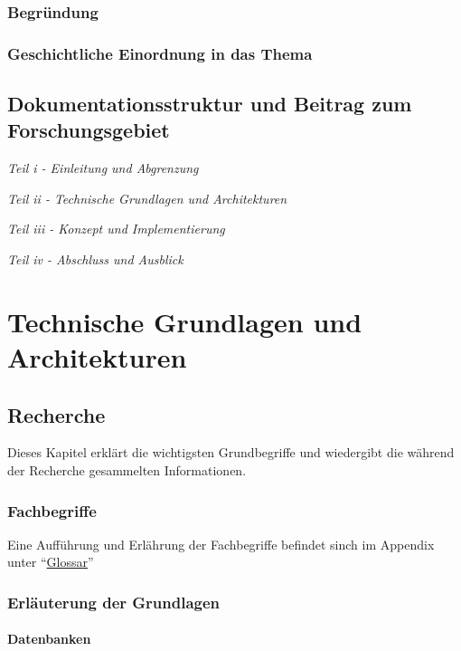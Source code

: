 \documentclass[oneside,11pt,parskip=half,ngerman]{scrreprt}
\begin{document}
\section{Begründung}\label{begruxfcndung}

\section{Geschichtliche Einordnung in das
Thema}\label{geschichtliche-einordnung-in-das-thema}

\chapter{Dokumentationsstruktur und Beitrag zum
Forschungsgebiet}\label{dokumentationsstruktur-und-beitrag-zum-forschungsgebiet}

\emph{Teil i - Einleitung und Abgrenzung}

\emph{Teil ii - Technische Grundlagen und Architekturen}

\emph{Teil iii - Konzept und Implementierung}

\emph{Teil iv - Abschluss und Ausblick}

\part[Teil ii]{Technische Grundlagen und Architekturen}

\chapter{Recherche}\label{recherche}

Dieses Kapitel erklärt die wichtigsten Grundbegriffe und wiedergibt die
während der Recherche gesammelten Informationen.

\section{Fachbegriffe}\label{fachbegriffe}

Eine Aufführung und Erlährung der Fachbegriffe befindet sinch im
Appendix unter \enquote{\hyperref[glossar]{Glossar}}

\section{Erläuterung der
Grundlagen}\label{erluxe4uterung-der-grundlagen}

\subsection{Datenbanken}\label{datenbanken}
\end{document}
